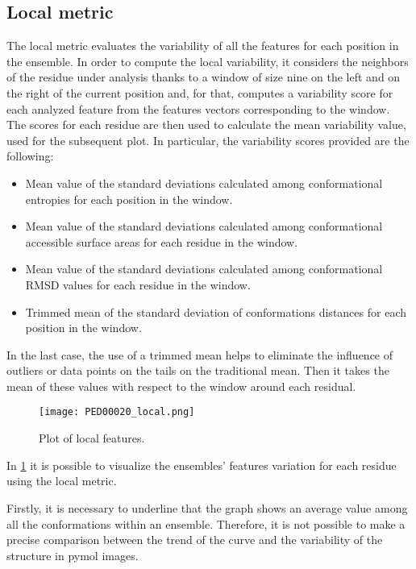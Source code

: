 \subsection{Local metric}
The local metric evaluates the variability of all the features for each position in the ensemble.
In order to compute the local variability, it considers the neighbors of the residue under analysis thanks to a window of size nine on the left and on the right of the current position and, for that, computes a variability score for each analyzed feature from the features vectors corresponding to the window. The scores for each residue are then used to calculate the mean variability value, used for the subsequent plot. In particular, the variability scores provided are the following:

\begin{itemize}
\item Mean value of the standard deviations calculated among conformational entropies for each position in the window.
\item Mean value of the standard deviations calculated among conformational accessible surface areas for each residue in the window.
\item Mean value of the standard deviations calculated among conformational RMSD values for each residue in the window. 
\item Trimmed mean of the standard deviation of conformations distances for each position in the window. 
\end{itemize}

In the last case, the use of a trimmed mean helps to eliminate the influence of outliers or data points on the tails on the traditional mean. Then it takes the mean of these values with respect to the window around each residual.

\begin{figure}[H]
	\begin{minipage}[b]{0.97\textwidth}
		\centering
		\texttt{[image: PED00020\_local.png]}
		\caption{Plot of local features.}
		\label{plot}
	\end{minipage}	
\end{figure}

In \ref{plot} it is possible to visualize the ensembles' features variation for each residue using the local metric. 

\medskip
Firstly, it is necessary to underline that the graph shows an average value among all the conformations within an ensemble. Therefore, it is not possible to make a precise comparison between the trend of the curve and the variability of the structure in pymol images. 

